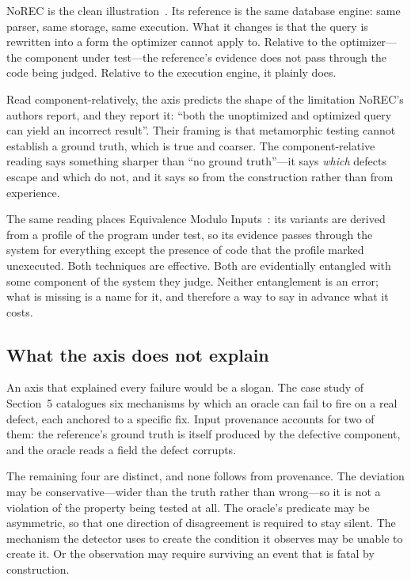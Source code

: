 NoREC is the clean illustration~\cite{rigger2020norec}. Its reference is the same
database engine: same parser, same storage, same execution. What it changes is that
the query is rewritten into a form the optimizer cannot apply to. Relative to the
optimizer---the component under test---the reference's evidence does not pass
through the code being judged. Relative to the execution engine, it plainly does.

Read component-relatively, the axis predicts the shape of the limitation NoREC's
authors report, and they report it: ``both the unoptimized and optimized query can
yield an incorrect result''. Their framing is that metamorphic testing cannot
establish a ground truth, which is true and coarser. The component-relative reading
says something sharper than ``no ground truth''---it says \emph{which} defects
escape and which do not, and it says so from the construction rather than from
experience.

The same reading places Equivalence Modulo Inputs~\cite{le2014emi}: its variants are
derived from a profile of the program under test, so its evidence passes through the
system for everything except the presence of code that the profile marked
unexecuted. Both techniques are effective. Both are evidentially entangled with some
component of the system they judge. Neither entanglement is an error; what is
missing is a name for it, and therefore a way to say in advance what it costs.

\subsection{What the axis does not explain}

An axis that explained every failure would be a slogan. The case study of Section~5
catalogues six mechanisms by which an oracle can fail to fire on a real defect, each
anchored to a specific fix. Input provenance accounts for two of them: the reference's
ground truth is itself produced by the defective component, and the oracle reads a
field the defect corrupts.

The remaining four are distinct, and none follows from provenance. The deviation may
be conservative---wider than the truth rather than wrong---so it is not a violation
of the property being tested at all. The oracle's predicate may be asymmetric, so
that one direction of disagreement is required to stay silent. The mechanism the
detector uses to create the condition it observes may be unable to create it. Or the
observation may require surviving an event that is fatal by construction.

